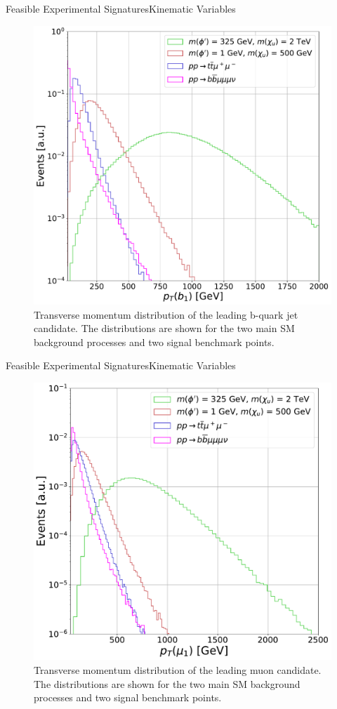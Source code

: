 \documentclass{../bredelebeamer}
\begin{document}
\begin{frame}{Feasible Experimental Signatures}{Kinematic Variables}
	\begin{figure}
	\centering
	\includegraphics[width=.6\linewidth]{PT_b1.pdf}
	\caption{Transverse momentum distribution of the leading \textrm{b}-quark jet candidate. The distributions are shown for the two main SM background processes and two signal benchmark points.\label{fig:pTb1}}
	\end{figure}
\end{frame}

\begin{frame}{Feasible Experimental Signatures}{Kinematic Variables}
	\begin{figure}
	\centering
	\includegraphics[width=.6\linewidth]{PT_mu1_1.pdf}
	\caption{Transverse momentum distribution of the leading muon candidate. The distributions are shown for the two main SM background processes and two signal benchmark points.\label{fig:pTmu1}}
	\end{figure}
\end{frame}
\end{document}
